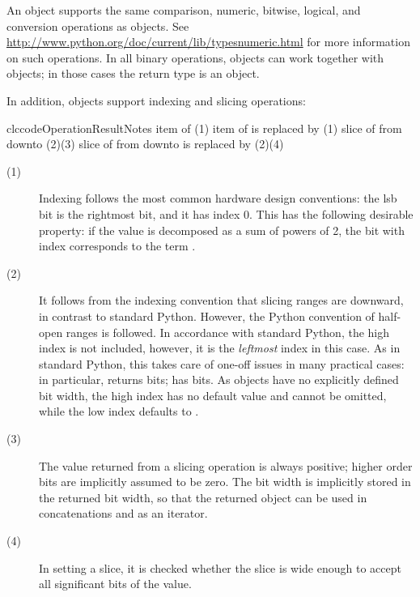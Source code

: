 An  object supports the same comparison, numeric,
bitwise, logical, and conversion operations as  objects. See
\url{http://www.python.org/doc/current/lib/typesnumeric.html} for more
information on such operations. In all binary operations,
 objects can work together with  objects; in
those cases the return type is an  object.

In addition,  objects support indexing and slicing
operations:

\begin{tableiii}{clc}{code}{Operation}{Result}{Notes}
	  {item  of }
	  {(1)}
	  {item  of  is replaced by } 
          {(1)}
          {slice of  from  downto } 
          {(2)(3)}
  	  {slice of  from  downto  is replaced
          by } 
          {(2)(4)}
\end{tableiii}

\begin{description}
\item[(1)] Indexing follows the most common hardware design
	  conventions: the lsb bit is the rightmost bit, and it has
	  index 0. This has the following desirable property: if the
	   value is decomposed as a sum of powers of 2,
	  the bit with index  corresponds to the term
	  .

\item[(2)] It follows from the indexing convention that slicing ranges
	  are downward, in contrast to standard Python. However, the
	  Python convention of half-open ranges is followed. In
	  accordance with standard Python, the high index is not
	  included, however, it is the \emph{leftmost} index in this
	  case. As in standard Python, this takes care of one-off
	  issues in many practical cases: in particular,
	   returns  bits;
	   has 
	  bits. As  objects have no explicitly defined
	  bit width, the high index  has no default value and
	  cannot be omitted, while the low index  defaults to
	  .

\item[(3)] The value returned from a slicing operation is always
	  positive; higher order bits are implicitly assumed to be
	  zero. The bit width is implicitly stored in the returned bit
	  width, so that the returned object can be used in
	  concatenations and as an iterator.

\item[(4)] In setting a slice, it is checked whether the slice is wide
	  enough to accept all significant bits of the value.
\end{description}

